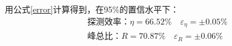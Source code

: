 \documentclass{article}
\begin{document}
用公式\ref{error}计算得到，在95\%的置信水平下：
\begin{equation}
    \begin{gathered}
        \text{探测效率：}\eta  = 66.52\%\quad \varepsilon _{\eta }=\pm  0.05\%\\
        \text{峰总比：}R=70.87\%\quad \varepsilon _R=\pm 0.06\%\\
    \end{gathered}
    \label{error1}
\end{equation}
\end{document}
